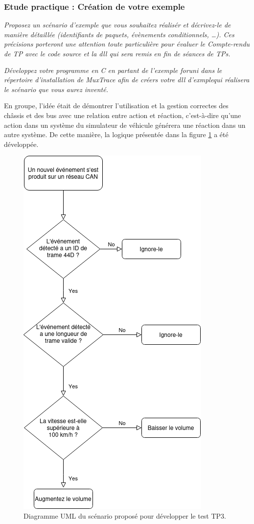 \documentclass{rapportECC}
\begin{document}

\subsubsection*{Etude practique : Création de votre exemple}

\textit{Proposez un scénario d'exemple que vous souhaitez réalisér et décrivez-le de manière détaillée (identifiants de paquets, évènements conditionnels, \dots). Ces précisions porteront une attention toute particulière pour évaluer le Compte-rendu de TP avec le code source et la dll qui sera remis en fin de séances de TPs.}

\textit{Développez votre programme en C en partant de l'exemple foruni dans le répertoire d'installation de MuxTrace afin de créers votre dll d'exmplequi réalisera le scénario que vous aurez inventé.}

En groupe, l'idée était de démontrer l'utilisation et la gestion correctes des châssis et des bus avec une relation entre action et réaction, c'est-à-dire qu'une action dans un système du simulateur de véhicule générera une réaction dans un autre système. De cette manière, la logique présentée dans la figure \ref{fig:OnCanEvent_UML} a été développée.

\begin{figure}[H]
    \centering
    \includegraphics[width=.5\textwidth]{./images/OnCanEvent_UML.png}
    \caption{Diagramme UML du scénario proposé pour développer le test TP3.}
    \label{fig:OnCanEvent_UML}
\end{figure}
\end{document}
